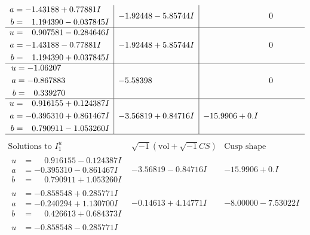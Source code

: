 \documentclass[1p]{elsarticle_modified}
\theoremstyle{definition}
\newcommand{\I}{\sqrt{-1}}
\begin{document}
$$\begin{array}{c|c|c}
\begin{aligned}
a &= -1.43188 + 0.77881 I \\
b &= \phantom{-}1.194390 - 0.037845 I\end{aligned}
 & -1.92448 - 5.85744 I & \phantom{-0.000000 } 0 \\ \hline\begin{aligned}
u &= \phantom{-}0.907581 - 0.284646 I \\
a &= -1.43188 - 0.77881 I \\
b &= \phantom{-}1.194390 + 0.037845 I\end{aligned}
 & -1.92448 + 5.85744 I & \phantom{-0.000000 } 0 \\ \hline\begin{aligned}
u &= -1.06207\phantom{ +0.000000I} \\
a &= -0.867883\phantom{ +0.000000I} \\
b &= \phantom{-}0.339270\phantom{ +0.000000I}\end{aligned}
 & -5.58398\phantom{ +0.000000I} & \phantom{-0.000000 } 0 \\ \hline\begin{aligned}
u &= \phantom{-}0.916155 + 0.124387 I \\
a &= -0.395310 + 0.861467 I \\
b &= \phantom{-}0.790911 - 1.053260 I\end{aligned}
 & -3.56819 + 0.84716 I & -15.9906 + 0. I\phantom{ +0.000000I}\\
 \hline 
 \end{array}$$\newpage$$\begin{array}{c|c|c}  
\text{Solutions to }I^u_{1}& \I (\text{vol} + \sqrt{-1}CS) & \text{Cusp shape}\\
 \hline 
\begin{aligned}
u &= \phantom{-}0.916155 - 0.124387 I \\
a &= -0.395310 - 0.861467 I \\
b &= \phantom{-}0.790911 + 1.053260 I\end{aligned}
 & -3.56819 - 0.84716 I & -15.9906 + 0. I\phantom{ +0.000000I} \\ \hline\begin{aligned}
u &= -0.858548 + 0.285771 I \\
a &= -0.240294 + 1.130700 I \\
b &= \phantom{-}0.426613 + 0.684373 I\end{aligned}
 & -0.14613 + 4.14771 I & -8.00000 - 7.53022 I \\ \hline\begin{aligned}
u &= -0.858548 - 0.285771 I \\

\end{aligned}
\end{array}$$
\end{document}

